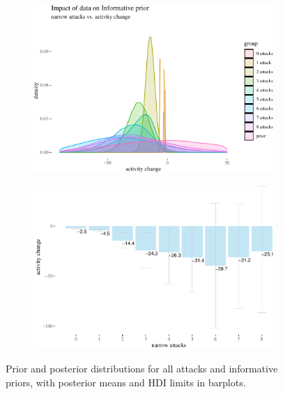 \documentclass[10pt,]{scrartcl}
\begin{document}
\begin{figure}[!ht]
\begin{subfigure}[!ht]{0.9\textwidth}

\begin{center}\includegraphics[width=1\linewidth]{redditAnalysisWalkthrough_files/figure-latex/unnamed-chunk-58-1} \end{center}
\end{subfigure} 


\begin{subfigure}[!ht]{0.9\textwidth}

\begin{center}\includegraphics[width=1\linewidth]{redditAnalysisWalkthrough_files/figure-latex/unnamed-chunk-59-1} \end{center}
\end{subfigure}

\caption{Prior and posterior distributions for all attacks and informative priors, with posterior means and HDI limits in barplots.}
\label{fig:bayesian3}
\end{figure}
\end{document}
